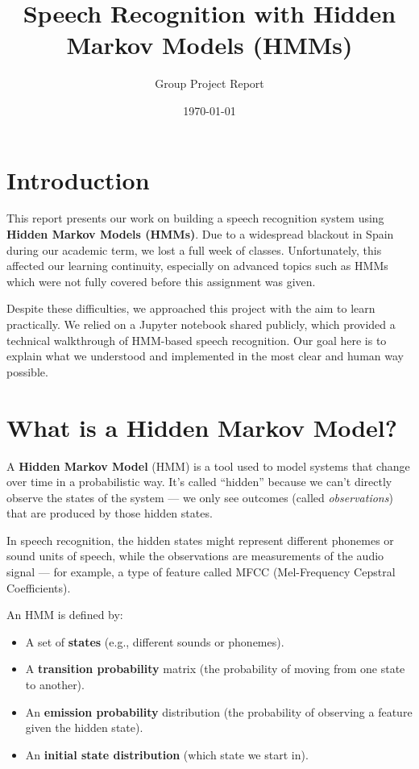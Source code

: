 \documentclass[11pt]{article}
\title{Speech Recognition with Hidden Markov Models (HMMs)}
\author{Group Project Report}
\date{\today}
\begin{document}
\maketitle

\section*{Introduction}

This report presents our work on building a speech recognition system using \textbf{Hidden Markov Models (HMMs)}. Due to a widespread blackout in Spain during our academic term, we lost a full week of classes. Unfortunately, this affected our learning continuity, especially on advanced topics such as HMMs which were not fully covered before this assignment was given.

Despite these difficulties, we approached this project with the aim to learn practically. We relied on a Jupyter notebook shared publicly, which provided a technical walkthrough of HMM-based speech recognition. Our goal here is to explain what we understood and implemented in the most clear and human way possible.

\section*{What is a Hidden Markov Model?}

A \textbf{Hidden Markov Model} (HMM) is a tool used to model systems that change over time in a probabilistic way. It’s called “hidden” because we can’t directly observe the states of the system — we only see outcomes (called \textit{observations}) that are produced by those hidden states.

In speech recognition, the hidden states might represent different phonemes or sound units of speech, while the observations are measurements of the audio signal — for example, a type of feature called MFCC (Mel-Frequency Cepstral Coefficients).

An HMM is defined by:
\begin{itemize}
  \item A set of \textbf{states} (e.g., different sounds or phonemes).
  \item A \textbf{transition probability} matrix (the probability of moving from one state to another).
  \item An \textbf{emission probability} distribution (the probability of observing a feature given the hidden state).
  \item An \textbf{initial state distribution} (which state we start in).
\end{itemize}
\end{document}
